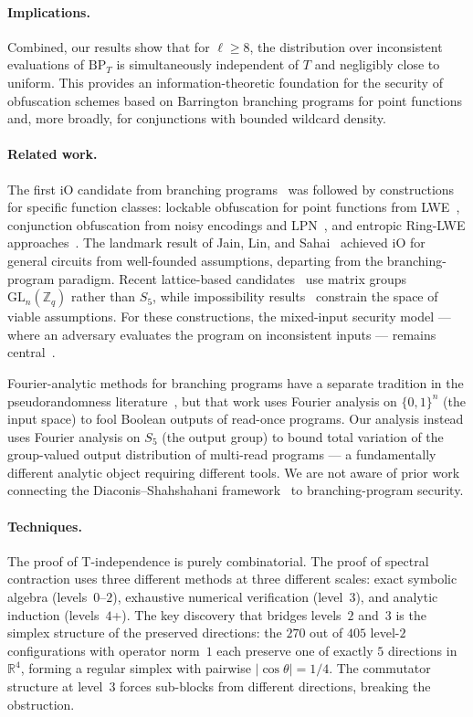 \documentclass[11pt]{article}
\newcommand{\abs}[1]{\lvert #1 \rvert}
\newcommand{\BP}{\mathrm{BP}}
\begin{document}
\paragraph{Implications.}
Combined, our results show that for $\ell \geq 8$, the distribution
over inconsistent evaluations of $\BP_T$ is simultaneously independent of
$T$ and negligibly close to uniform. This provides an information-theoretic
foundation for the security of obfuscation schemes based on Barrington branching
programs for point functions and, more broadly, for conjunctions with
bounded wildcard density.

\paragraph{Related work.}
The first iO candidate from branching programs~\cite{GGH+13} was followed
by constructions for specific function
classes: lockable obfuscation for point functions from
LWE~\cite{GKW17,WZ17}, conjunction obfuscation from noisy encodings
and LPN~\cite{BKMPRS18,BLMZ19}, and entropic Ring-LWE
approaches~\cite{BVWW16}.  The landmark result of Jain, Lin, and
Sahai~\cite{JLS21} achieved iO for general circuits from well-founded
assumptions, departing from the branching-program paradigm.  Recent
lattice-based candidates~\cite{BDGM20,WW21,HJL25} use matrix groups
$\mathrm{GL}_n(\mathbb{Z}_q)$ rather than $S_5$, while impossibility
results~\cite{DJMMV25} constrain the space of viable assumptions.
For these constructions, the mixed-input security model --- where an
adversary evaluates the program on inconsistent inputs --- remains
central~\cite{CVW18}.

Fourier-analytic methods for branching programs have a separate tradition
in the pseudorandomness literature~\cite{RSV13,LPV22}, but that
work uses Fourier analysis on $\{0,1\}^n$ (the input space) to fool
Boolean outputs of read-once programs.  Our analysis instead uses Fourier
analysis on $S_5$ (the output group) to bound total variation of the
group-valued output distribution of multi-read programs --- a fundamentally
different analytic object requiring different tools.  We are not aware of
prior work connecting the Diaconis--Shahshahani framework~\cite{DS81} to
branching-program security.

\paragraph{Techniques.}
The proof of T-independence is purely combinatorial. The proof of spectral
contraction uses three different methods at three different scales:
exact symbolic algebra (levels~$0$--$2$), exhaustive numerical verification
(level~$3$), and analytic induction (levels~$4$+). The key discovery
that bridges levels~$2$ and~$3$ is the simplex structure of the
preserved directions: the $270$ out of $405$ level-$2$ configurations
with operator norm~$1$ each preserve one of exactly $5$ directions in
$\mathbb{R}^4$, forming a regular simplex with pairwise $\abs{\cos\theta} = 1/4$.
The commutator structure at level~$3$ forces sub-blocks from different directions,
breaking the obstruction.
\end{document}
